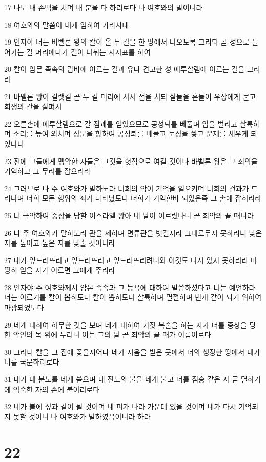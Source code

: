 \par 17 나도 내 손뼉을 치며 내 분을 다 하리로다 나 여호와의 말이니라
\par 18 여호와의 말씀이 내게 임하여 가라사대
\par 19 인자야 너는 바벨론 왕의 칼이 올 두 길을 한 땅에서 나오도록 그리되 곧 성으로 들어가는 길 머리에다가 길이 나뉘는 지시표를 하여
\par 20 칼이 암몬 족속의 랍바에 이르는 길과 유다 견고한 성 예루살렘에 이르는 길을 그리라
\par 21 바벨론 왕이 갈랫길 곧 두 길 머리에 서서 점을 치되 살들을 흔들어 우상에게 묻고 희생의 간을 살펴서
\par 22 오른손에 예루살렘으로 갈 점괘를 얻었으므로 공성퇴를 베풀며 입을 벌리고 살륙하며 소리를 높여 외치며 성문을 향하여 공성퇴를 베풀고 토성을 쌓고 운제를 세우게 되었나니
\par 23 전에 그들에게 맹약한 자들은 그것을 헛점으로 여길 것이나 바벨론 왕은 그 죄악을 기억하고 그 무리를 잡으리라
\par 24 그러므로 나 주 여호와가 말하노라 너희의 악이 기억을 일으키며 너희의 건과가 드러나며 너희 모든 행위의 죄가 나타났도다 너희가 기억한바 되었은즉 그 손에 잡히리라
\par 25 너 극악하여 중상을 당할 이스라엘 왕아 네 날이 이르렀나니 곧 죄악의 끝 때니라
\par 26 나 주 여호와가 말하노라 관을 제하며 면류관을 벗길지라 그대로두지 못하리니 낮은 자를 높이고 높은 자를 낮출 것이니라
\par 27 내가 엎드러뜨리고 엎드러뜨리고 엎드러뜨리려니와 이것도 다시 있지 못하리라 마땅히 얻을 자가 이르면 그에게 주리라
\par 28 인자야 주 여호와께서 암몬 족속과 그 능욕에 대하여 말씀하셨다고 너는 예언하라 너는 이르기를 칼이 뽑히도다 칼이 뽑히도다 살륙하며 멸절하며 번개 같이 되기 위하여 마광되었도다
\par 29 네게 대하여 허무한 것을 보며 네게 대하여 거짓 복술을 하는 자가 너를 중상을 당한 악인의 목 위에 두리니 이는 그의 날 곧 죄악의 끝 때가 이름이로다
\par 30 그러나 칼을 그 집에 꽂을지어다 네가 지음을 받은 곳에서 너의 생장한 땅에서 내가 너를 국문하리로다
\par 31 내가 내 분노를 네게 쏟으며 내 진노의 불을 네게 불고 너를 짐승 같은 자 곧 멸하기에 익숙한 자의 손에 붙이리로다
\par 32 네가 불에 섶과 같이 될 것이며 네 피가 나라 가운데 있을 것이며 네가 다시 기억되지 못할 것이니 나 여호와가 말하였음이니라 하라

\chapter{22}

